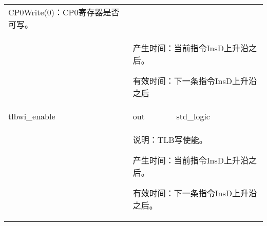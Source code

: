 \begin{tabularx}{\textwidth}{lll}
{                CP0Write(0)：CP0寄存器是否可写。
            } \\
            &
            \multicolumn{2}{X}{
                产生时间：当前指令InsD上升沿之后。

                有效时间：下一条指令InsD上升沿之后 
            } \\
            \midrule
            tlbwi\_enable   & out       & std\_logic \\
            \cmidrule(l){2-3}
            &
            \multicolumn{2}{X}{
                说明：TLB写使能。

                产生时间：当前指令InsD上升沿之后。

                有效时间：下一条指令InsD上升沿之后。
            } \\
            \bottomrule
            \end{tabularx}

